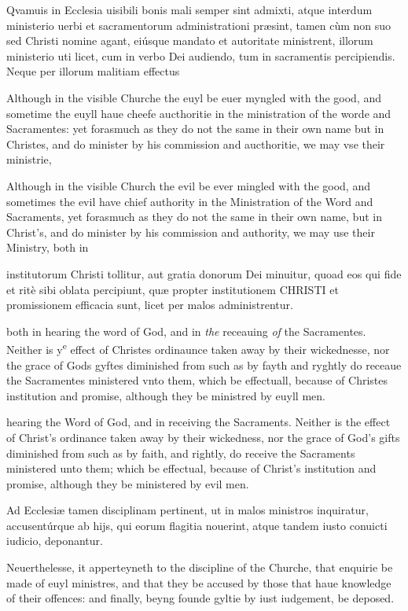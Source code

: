 
Qvamuis in Ecclesia uisibili bonis mali semper sint admixti, atque interdum ministerio uerbi et sacramentorum administrationi præsint, tamen cùm non suo sed Christi nomine agant, eiúsque mandato et autoritate ministrent, illorum ministerio uti licet, cum in verbo Dei audiendo, tum in sacramentis percipiendis. Neque per illorum malitiam effectus

Although in the visible Churche the euyl be euer myngled with the good, and sometime the euyll haue cheefe aucthoritie in the ministration of the worde and Sacramentes: yet forasmuch as they do not the same in their own name but in Christes, and do minister by his commission and aucthoritie, we may vse their ministrie,

Although in the visible Church the evil be ever mingled with the good, and sometimes the evil have chief authority in the Ministration of the Word and Sacraments, yet forasmuch as they do not the same in their own name, but in Christ's, and do minister by his commission and authority, we may use their Ministry, both in

institutorum Christi tollitur, aut gratia donorum Dei minuitur, quoad eos qui fide et ritè sibi oblata percipiunt, quæ propter institutionem CHRISTI et promissionem efficacia sunt, licet per malos administrentur.

both in hearing the word of God, and in \emph{the} receauing \emph{of} the Sacramentes. Neither is y\textsuperscript{e} effect of Christes ordinaunce taken away by their wickednesse, nor the grace of Gods gyftes diminished from such as by fayth and ryghtly do receaue the Sacramentes ministered vnto them, which be effectuall, because of Christes institution and promise, although they be ministred by euyll men.

hearing the Word of God, and in receiving the Sacraments. Neither is the effect of Christ's ordinance taken away by their wickedness, nor the grace of God's gifts diminished from such as by faith, and rightly, do receive the Sacraments ministered unto them; which be effectual, because of Christ's institution and promise, although they be ministered by evil men.

Ad Ecclesiæ tamen disciplinam pertinent, ut in malos ministros inquiratur, accusentúrque ab hijs, qui eorum flagitia nouerint, atque tandem iusto conuicti iudicio, deponantur.

Neuerthelesse, it apperteyneth to the discipline of the Churche, that enquirie be made of euyl ministres, and that they be accused by those that haue knowledge of their offences: and finally, beyng founde gyltie by iust iudgement, be deposed.

